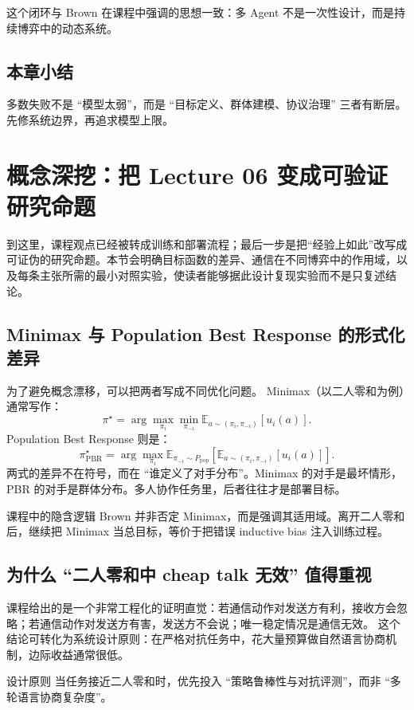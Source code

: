 \documentclass[a4paper]{article}
\begin{document}
这个闭环与 Brown 在课程中强调的思想一致：多 Agent 不是一次性设计，而是持续博弈中的动态系统。

\subsection{本章小结}
多数失败不是 ``模型太弱''，而是 ``目标定义、群体建模、协议治理'' 三者有断层。先修系统边界，再追求模型上限。

\section{概念深挖：把 Lecture 06 变成可验证研究命题}

到这里，课程观点已经被转成训练和部署流程；最后一步是把“经验上如此”改写成可证伪的研究命题。本节会明确目标函数的差异、通信在不同博弈中的作用域，以及每条主张所需的最小对照实验，使读者能够据此设计复现实验而不是只复述结论。

\subsection{Minimax 与 Population Best Response 的形式化差异}
为了避免概念漂移，可以把两者写成不同优化问题。
Minimax（以二人零和为例）通常写作：
\[
\pi^\star = \arg\max_{\pi_i}\min_{\pi_{-i}} \mathbb{E}_{a\sim(\pi_i,\pi_{-i})}[u_i(a)].
\]
Population Best Response 则是：
\[
\pi^\star_{\text{PBR}}=\arg\max_{\pi_i}\mathbb{E}_{\pi_{-i}\sim P_{\text{pop}}}\left[\mathbb{E}_{a\sim(\pi_i,\pi_{-i})}[u_i(a)]\right].
\]
两式的差异不在符号，而在 ``谁定义了对手分布''。Minimax 的对手是最坏情形，PBR 的对手是群体分布。多人协作任务里，后者往往才是部署目标。

\begin{knowledgebox}{课程中的隐含逻辑}
Brown 并非否定 Minimax，而是强调其适用域。离开二人零和后，继续把 Minimax 当总目标，等价于把错误 inductive bias 注入训练过程。
\end{knowledgebox}

\subsection{为什么 ``二人零和中 cheap talk 无效'' 值得重视}
课程给出的是一个非常工程化的证明直觉：若通信动作对发送方有利，接收方会忽略；若通信动作对发送方有害，发送方不会说；唯一稳定情况是通信无效。
这个结论可转化为系统设计原则：在严格对抗任务中，花大量预算做自然语言协商机制，边际收益通常很低。

\begin{importantbox}{设计原则}
当任务接近二人零和时，优先投入 ``策略鲁棒性与对抗评测''，而非 ``多轮语言协商复杂度''。
\end{importantbox}
\end{document}
